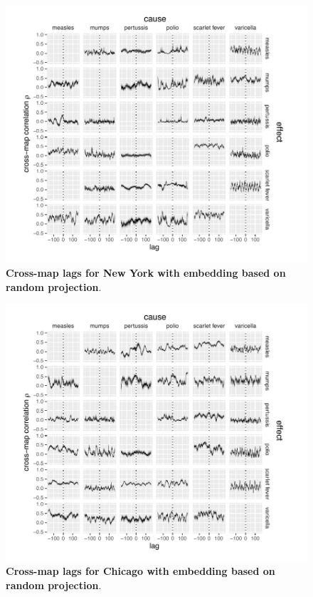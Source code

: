 \begin{figure}%
\begin{center}
  \includegraphics[width=6in]{dataflow/out/fig_cities_corrbylag/nyc_cross_projection.pdf}
  \end{center}
  \caption{\textbf{Cross-map lags for New York with embedding based on random projection}.  \label{fig:cities_corrbylag_nyc_cross_projection}}
\end{figure}

\begin{figure}%
\begin{center}
  \includegraphics[width=6in]{dataflow/out/fig_cities_corrbylag/chi_cross_projection.pdf}
  \end{center}
  \caption{\textbf{Cross-map lags for Chicago with embedding based on random projection}.  \label{fig:cities_corrbylag_chi_cross_projection}}
\end{figure}
